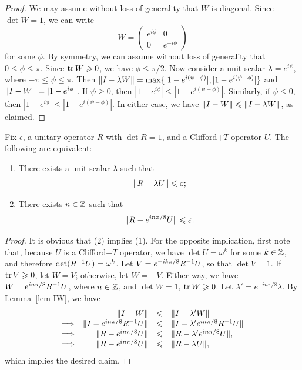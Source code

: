 \documentclass{article}
\begin{document}
\begin{proof}
  We may assume without loss of generality that $W$ is diagonal. Since
  $\det W = 1$, we can write
  \[ W = \begin{pmatrix} e^{i\phi} & 0 \\ 0 & e^{-i\phi}
  \end{pmatrix}
  \]
  for some $\phi$. By symmetry, we can assume without loss of
  generality that $0\leq\phi\leq\pi$. Since $\mathop{{\rm tr}}\nolimits W\geqslant 0$, we have
  $\phi\leq\pi/2$. Now consider a unit scalar $\lambda=e^{i\psi}$,
  where $-\pi\leq\psi\leq\pi$.  Then $\|I-\lambda W\| =
  \max\{|1-e^{i(\psi+\phi)}|, |1-e^{i(\psi-\phi)}|\}$ and $\|I-W\|
  = |1-e^{i\phi}|$. If $\psi\geq 0$, then
  $|1-e^{i\phi}|\leq|1-e^{i(\psi+\phi)}|$. Similarly, if $\psi\leq 0$,
  then $|1-e^{i\phi}|\leq|1-e^{i(\psi-\phi)}|$. In either case, we
  have $\|I-W\| \leqslant \|I-\lambda W\|$, as claimed.
\end{proof}

\begin{lemma}\label{lem-discrete-phase}
  Fix $\epsilon$, a unitary operator $R$ with $\det R=1$, and a
  Clifford+$T$ operator $U$. The following are equivalent:
  \begin{enumerate}\roundlabels
  \item There exists a unit scalar $\lambda$ such that
    \[ \|R-\lambda U\|\leqslant\varepsilon;
    \]
  \item There exists $n\in\mathbb{Z}$ such that
    \[ \|R-e^{in\pi/8} U\|\leqslant\varepsilon.
    \]
  \end{enumerate}
\end{lemma}

\begin{proof}
  It is obvious that (2) implies (1). For the opposite implication,
  first note that, because $U$ is a Clifford+$T$ operator, we have
  $\det U=\omega^k$ for some $k\in\mathbb{Z}$, and therefore $\det (R^{-1} U) =
  \omega^{k}$. Let $V=e^{-ik\pi/8}R^{-1} U$, so that $\det V=1$. If
  $\mathop{{\rm tr}}\nolimits V\geqslant 0$, let $W=V$; otherwise, let $W=-V$. Either way, we have
  $W=e^{in\pi/8}R^{-1} U$, where $n\in\mathbb{Z}$, and $\det W=1$, $\mathop{{\rm tr}}\nolimits W\geqslant
  0$. Let $\lambda' = e^{-in\pi/8}\lambda$. By Lemma~\ref{lem-IW}, we
  have
  \[ \begin{array}{crcl}
    & \|I-W\| &\leqslant& \|I-\lambda' W\| \\
    \Longrightarrow &
    \|I-e^{in\pi/8}R^{-1} U\|  &\leqslant& 
    \|I-\lambda' e^{in\pi/8}R^{-1} U\| \\
    \Longrightarrow &
    \|R-e^{in\pi/8} U\|  &\leqslant& 
    \|R-\lambda' e^{in\pi/8} U\|,\\
    \Longrightarrow &
    \|R-e^{in\pi/8} U\|  &\leqslant& 
    \|R-\lambda U\|, \\
  \end{array}
  \]
  which implies the desired claim.
\end{proof}
\end{document}
